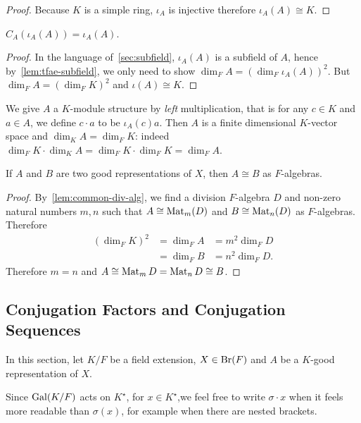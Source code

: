 \begin{proof}
  Because $K$ is a simple ring, $\iota_{A}$ is injective therefore $\iota_{A}(A)\cong K$.
\end{proof}

\begin{lemma}\label{lem:centralizer-range-good-rep}
  $C_{A}\left(\iota_{A}(A)\right) = \iota_{A}(A)$.
  \leanok
\end{lemma}
\begin{proof}
  In the language of~\cref{sec:subfield}, $\iota_{A}(A)$ is a subfield of $A$, hence by~\cref{lem:tfae-subfield}, we only need to show $\dim_{F}A = {\left(\dim_{F}\iota_{A}(A)\right)}^{2}$. But $\dim_{F}A={\left(\dim_{F}K\right)}^{2}$ and $\iota(A)\cong K$.
\end{proof}

\begin{construction}\label{con:good-rep-mod}
  We give $A$ a $K$-module structure by {\em left} multiplication, that is for any $c \in K$ and $a \in A$, we define $c\cdot a$ to be $\iota_{A}(c)a$. Then $A$ is a finite dimensional $K$-vector space and $\dim_{K}A=\dim_{F}K$: indeed $\dim_{F}K\cdot\dim_{K}A = \dim_{F}K\cdot \dim_{F}K = \dim_{F}A$.
  \leanok
\end{construction}

\begin{lemma}\label{lem:good-rep-iso}
  If $A$ and $B$ are two good representations of $X$, then $A \cong B$ as $F$-algebras.
  \leanok
\end{lemma}
\begin{proof}
  By~\cref{lem:common-div-alg}, we find a division $F$-algebra $D$ and non-zero natural numbers $m, n$ such that $A \cong \operatorname{Mat}_{m}(D)$ and $B \cong \operatorname{Mat}_{n}(D)$ as $F$-algebras. Therefore
  \[
    \begin{aligned}
      {\left(\dim_{F}K\right)}^{2} &= \dim_{F}A &= m^{2}\dim_{F}D \\
      &= \dim_{F}B &= n^{2}\dim_{F}D.
    \end{aligned}
  \]
  Therefore $m = n$ and $A \cong \operatorname{Mat}_{m}D =\operatorname{Mat}_{n}D\cong B$.
\end{proof}

\subsection{Conjugation Factors and Conjugation Sequences}
In this section, let $K/F$ be a field extension, $X \in \operatorname{Br}(F)$ and $A$ be a $K$-good representation of $X$.
\begin{remark}
  Since $\operatorname{Gal}(K/F)$ acts on $K^{\star}$, for $x\in K^{\star}$,we feel free to write $\sigma\cdot x$ when it feels more readable than $\sigma(x)$, for example when there are nested brackets.
\end{remark}


